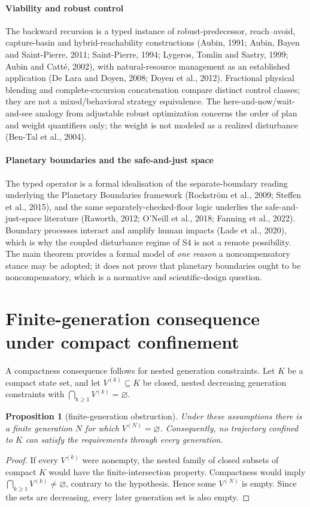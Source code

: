 \documentclass[preprint,11pt,authoryear]{elsarticle}
\newtheorem{proposition}{Proposition}
\theoremstyle{remark}
\begin{document}
\paragraph{Viability and robust control} The backward recursion is a typed instance of robust-predecessor, reach--avoid, capture-basin and hybrid-reachability constructions (Aubin, 1991; Aubin, Bayen and Saint-Pierre, 2011; Saint-Pierre, 1994; Lygeros, Tomlin and Sastry, 1999; Aubin and Catt\'e, 2002), with natural-resource management as an established application (De Lara and Doyen, 2008; Doyen et al., 2012). Fractional physical blending and complete-excursion concatenation compare distinct control classes; they are not a mixed/behavioral strategy equivalence. The here-and-now/wait-and-see analogy from adjustable robust optimization concerns the order of plan and weight quantifiers only; the weight is not modeled as a realized disturbance (Ben-Tal et al., 2004).

\paragraph{Planetary boundaries and the safe-and-just space} The typed operator is a formal idealisation of the separate-boundary reading underlying the Planetary Boundaries framework (Rockstr\"om et al., 2009; Steffen et al., 2015), and the same separately-checked-floor logic underlies the safe-and-just-space literature (Raworth, 2012; O'Neill et al., 2018; Fanning et al., 2022). Boundary processes interact and amplify human impacts (Lade et al., 2020), which is why the coupled disturbance regime of S4 is not a remote possibility. The main theorem provides a formal model of \emph{one reason} a noncompensatory stance may be adopted; it does not prove that planetary boundaries ought to be noncompensatory, which is a normative and scientific-design question.

\section{Finite-generation consequence under compact confinement}\label{si:finitegeneration}

A compactness consequence follows for nested generation constraints. Let $K$ be a compact state set, and let $V^{(k)}\subseteq K$ be closed, nested decreasing generation constraints with $\bigcap_{k\ge1}V^{(k)}=\varnothing$.

\begin{proposition}[finite-generation obstruction]\label{prop:finitegeneration}
Under these assumptions there is a finite generation $N$ for which $V^{(N)}=\varnothing$. Consequently, no trajectory confined to $K$ can satisfy the requirements through every generation.
\end{proposition}
\begin{proof}
If every $V^{(k)}$ were nonempty, the nested family of closed subsets of compact $K$ would have the finite-intersection property. Compactness would imply $\bigcap_{k\ge1}V^{(k)}\ne\varnothing$, contrary to the hypothesis. Hence some $V^{(N)}$ is empty. Since the sets are decreasing, every later generation set is also empty.
\end{proof}
\end{document}
